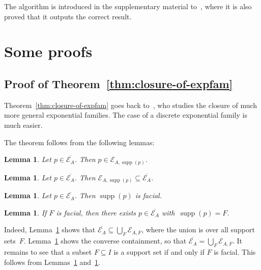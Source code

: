 \documentclass[aos,noinfoline]{imsart}
\DeclareMathOperator{\supp}{supp}
\newcommand{\Ecal}{\mathcal{E}}
\newcommand{\ol}[1]{\overline{#1}}
\newtheorem{lemma}[theorem]{Lemma}
\theoremstyle{remark}
\theoremstyle{definition}
\begin{document}
The algorithm is introduced in the supplementary material to~\citep{FienbergRinaldo12:MLE_in_loglinear_models}, where it
is also proved that it outputs the correct result.

\section{Some proofs}
\label{sec:S-proofs}

\subsection{Proof of Theorem~\ref{thm:closure-of-expfam}}
\label{S-sec:proof1}

Theorem~\ref{thm:closure-of-expfam} goes back to~\cite{Barndorff:exponential_families}, who studies the closure of much more general exponential
families.  The case of a discrete exponential family is much easier.

The theorem follows from the following lemmas:
\begin{lemma}
  \label{S-lem:p-is-truncation}
  Let $p\in\ol{\Ecal_{A}}$.  Then $p\in\Ecal_{A,\supp(p)}$.
\end{lemma}
\begin{lemma}
  \label{S-lem:any-truncation}
  Let $p\in\ol{\Ecal_{A}}$.  Then $\Ecal_{A,\supp(p)}\subseteq\ol{\Ecal_A}$.
\end{lemma}
\begin{lemma}
  \label{S-lem:supp-is-facial}
  Let $p\in\ol{\Ecal_{A}}$.  Then $\supp(p)$ is facial.  
\end{lemma}
\begin{lemma}
  \label{S-lem:facial-is-supp}
  If $F$ is facial, then there exists $p\in\ol{\Ecal_{A}}$ with~$\supp(p)=F$.
\end{lemma}
Indeed, Lemma~\ref{S-lem:p-is-truncation} shows that $\ol{\Ecal_A}\subseteq\bigcup_{F}\Ecal_{A,F}$, where the union is
over all support sets~$F$.  Lemma~\ref{S-lem:any-truncation} shows the converse containment, so that
$\ol{\Ecal_A}=\bigcup_{F}\Ecal_{A,F}$.  It remains to see that a subset $F\subseteq I$ is a support set if and only if
$F$ is facial.  This follows from Lemmas~\ref{S-lem:supp-is-facial} and~\ref{S-lem:facial-is-supp}.
\end{document}
